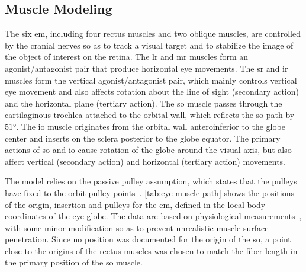 \documentclass[11pt,a4paper,draft=false]{report}
\begin{document}
\subsection*{Muscle Modeling}\label{sec:muscle-modeling}

The six \gls{em}, including four rectus muscles and two oblique muscles, are
controlled by the cranial nerves so as to track a visual target and to stabilize
the image of the object of interest on the retina. The \gls{lr} and \gls{mr}
muscles form an agonist/antagonist pair that produce horizontal eye
movements. The \gls{sr} and \gls{ir} muscles form the vertical
agonist/antagonist pair, which mainly controls vertical eye movement and also
affects rotation about the line of sight (secondary action) and the horizontal
plane (tertiary action). The \gls{so} muscle passes through the cartilaginous
trochlea attached to the orbital wall, which reflects the \gls{so} path by
$51 \si{\degree}$. The \gls{io} muscle originates from the orbital wall
anteroinferior to the globe center and inserts on the sclera posterior to the
globe equator. The primary actions of \gls{so} and \gls{io} cause rotation of
the globe around the visual axis, but also affect vertical (secondary action)
and horizontal (tertiary action) movements.

The model relies on the passive pulley assumption, which states that the pulleys
have fixed to the orbit pulley points~\cite{Clark1977,
  Miller2007}. \autoref{tab:eye-muscle-path} shows the positions of the origin,
insertion and pulleys for the \gls{em}, defined in the local body coordinates of
the eye globe. The data are based on physiological
measurements~\cite{Iskander2018}, with some minor modification so as to prevent
unrealistic muscle-surface penetration. Since no position was documented for the
origin of the \gls{so}, a point close to the origins of the rectus muscles was
chosen to match the fiber length in the primary position of the \gls{so} muscle.
\end{document}
